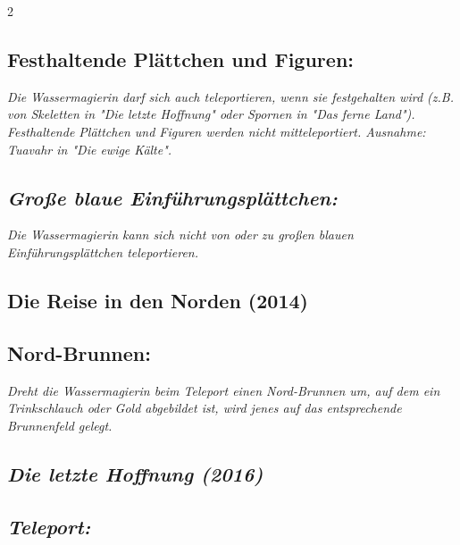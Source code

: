 \documentclass[10pt, a4paper, oneside]{book}
\newcommand{\fan}[1]{\textit{#1}}
\begin{document}
\begin{multicols*}{2}
\begin{nobgcolor}
\subsection{Festhaltende Plättchen und Figuren:}


\fan{Die Wassermagierin darf sich auch teleportieren, wenn sie festgehalten wird (z.B. von Skeletten in "Die letzte Hoffnung" oder Spornen in "Das ferne Land"). Festhaltende Plättchen und Figuren werden nicht mitteleportiert. Ausnahme: Tuavahr in "Die ewige Kälte".}



\subsection{\fan{Große blaue Einführungsplättchen:}}

\fan{Die Wassermagierin kann sich nicht von oder zu großen blauen Einführungsplättchen teleportieren.}



\end{nobgcolor}



\begin{bgcolor}
\section{Die Reise in den Norden (2014)}


\subsection{Nord-Brunnen:}

\fan{Dreht die Wassermagierin beim Teleport einen Nord-Brunnen um, auf dem ein Trinkschlauch oder Gold abgebildet ist, wird jenes auf das entsprechende Brunnenfeld gelegt.}


\end{bgcolor}



\columnbreak


\begin{bgcolor}
\section{\fan{Die letzte Hoffnung (2016)}}

\subsection{\fan{Teleport:}}


\end{bgcolor}
\end{multicols*}
\end{document}
